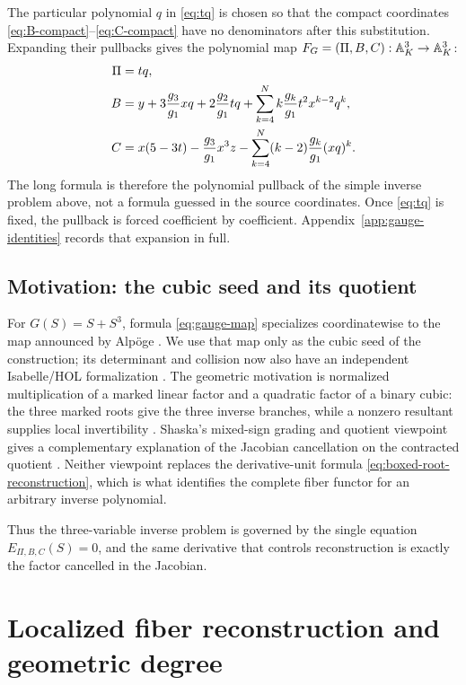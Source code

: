 The particular polynomial \(q\) in \eqref{eq:tq} is chosen so that the
compact coordinates \eqref{eq:B-compact}--\eqref{eq:C-compact} have no
denominators after this substitution.  Expanding their pullbacks gives the
polynomial map \(F_G=(\Pi,B,C):\mathbb A^3_K\to\mathbb A^3_K\):
\begin{align}
 \Pi={}&tq,\notag\\
 B={}&y+3\frac{g_3}{g_1}xq+2\frac{g_2}{g_1}tq
       +\sum_{k=4}^N k\frac{g_k}{g_1}
          t^2x^{k-2}q^k,\notag\\
 C={}&x(5-3t)-\frac{g_3}{g_1}x^3z
       -\sum_{k=4}^N(k-2)\frac{g_k}{g_1}(xq)^k.
 \label{eq:gauge-map}
\end{align}
The long formula is therefore the polynomial pullback of the simple inverse
problem above, not a formula guessed in the source coordinates.  Once
\eqref{eq:tq} is fixed, the pullback is forced coefficient by coefficient.
Appendix~\ref{app:gauge-identities} records that expansion in full.

\subsection{Motivation: the cubic seed and its quotient}

For \(G(S)=S+S^3\), formula \eqref{eq:gauge-map} specializes coordinatewise
to the map announced by Alp\"oge \cite{Alpoge}.  We use that map only as the
cubic seed of the construction; its determinant and collision now also have
an independent Isabelle/HOL formalization \cite{IsabelleAFP}.  The geometric
motivation is normalized multiplication of a marked linear factor and a
quadratic factor of a binary cubic: the three marked roots give the three
inverse branches, while a nonzero resultant supplies local invertibility
\cite{TaoDigest}.  Shaska's mixed-sign grading and quotient viewpoint gives
a complementary explanation of the Jacobian cancellation on the contracted
quotient \cite{Shaska}.  Neither viewpoint replaces the derivative-unit
formula \eqref{eq:boxed-root-reconstruction}, which is what identifies the
complete fiber functor for an arbitrary inverse polynomial.

Thus the three-variable inverse problem is governed by the single equation
\(E_{\Pi,B,C}(S)=0\), and the same derivative that controls reconstruction
is exactly the factor cancelled in the Jacobian.

\section{Localized fiber reconstruction and geometric degree}
\label{sec:reconstruction}


